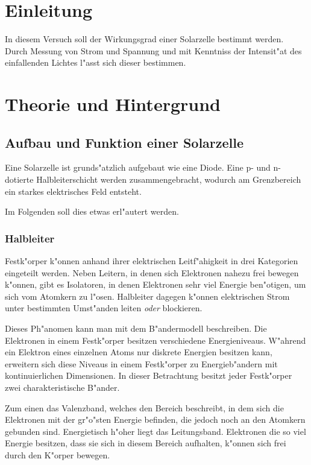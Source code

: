 \section{Einleitung}
	\label{sec:einleitung}
	In diesem Versuch soll der Wirkungsgrad einer Solarzelle bestimmt werden.
	Durch Messung von Strom und Spannung und mit Kenntniss der Intensit"at des einfallenden Lichtes l"asst sich dieser bestimmen.


\section{Theorie und Hintergrund}
	\label{sec:theorie}

	\subsection{Aufbau und Funktion einer Solarzelle}
		\label{subsec:aufbau_funktion}
		Eine Solarzelle ist grunds"atzlich aufgebaut wie eine Diode.
		Eine p- und n-dotierte Halbleiterschicht werden zusammengebracht, wodurch am Grenzbereich ein starkes elektrisches Feld entsteht.

		Im Folgenden soll dies etwas erl"autert werden.

		\subsubsection{Halbleiter}
			\label{subsub:halbleiter}
			Festk"orper k"onnen anhand ihrer elektrischen Leitf"ahigkeit in drei Kategorien eingeteilt werden.
			Neben Leitern, in denen sich Elektronen nahezu frei bewegen k"onnen, gibt es Isolatoren, in denen Elektronen sehr viel Energie ben"otigen, um sich vom Atomkern zu l"osen.
			Halbleiter dagegen k"onnen elektrischen Strom unter bestimmten Umst"anden leiten \emph{oder} blockieren.

			
			Dieses Ph"anomen kann man mit dem B"andermodell beschreiben.
			Die Elektronen in einem Festk"orper besitzen verschiedene Energieniveaus.
			W"ahrend ein Elektron eines einzelnen Atoms nur diskrete Energien besitzen kann, erweitern sich diese Niveaus in einem Festk"orper zu Energieb"andern mit kontinuierlichen Dimensionen.
			In dieser Betrachtung besitzt jeder Festk"orper zwei charakteristische B"ander.

			Zum einen das Valenzband, welches den Bereich beschreibt, in dem sich die Elektronen mit der gr"o"sten Energie befinden, die jedoch noch an den Atomkern gebunden sind.
			Energietisch h"oher liegt das Leitungsband.
			Elektronen die so viel Energie besitzen, dass sie sich in diesem Bereich aufhalten, k"onnen sich frei durch den K"orper bewegen.
			
